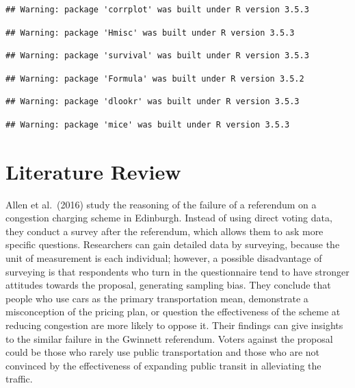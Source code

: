 \documentclass[
]{article}
\begin{document}
\begin{verbatim}
## Warning: package 'corrplot' was built under R version 3.5.3
\end{verbatim}

\begin{verbatim}
## Warning: package 'Hmisc' was built under R version 3.5.3
\end{verbatim}

\begin{verbatim}
## Warning: package 'survival' was built under R version 3.5.3
\end{verbatim}

\begin{verbatim}
## Warning: package 'Formula' was built under R version 3.5.2
\end{verbatim}

\begin{verbatim}
## Warning: package 'dlookr' was built under R version 3.5.3
\end{verbatim}

\begin{verbatim}
## Warning: package 'mice' was built under R version 3.5.3
\end{verbatim}

\hypertarget{literature-review}{%
\section{Literature Review}\label{literature-review}}

Allen et al.~(2016) study the reasoning of the failure of a referendum
on a congestion charging scheme in Edinburgh. Instead of using direct
voting data, they conduct a survey after the referendum, which allows
them to ask more specific questions. Researchers can gain detailed data
by surveying, because the unit of measurement is each individual;
however, a possible disadvantage of surveying is that respondents who
turn in the questionnaire tend to have stronger attitudes towards the
proposal, generating sampling bias. They conclude that people who use
cars as the primary transportation mean, demonstrate a misconception of
the pricing plan, or question the effectiveness of the scheme at
reducing congestion are more likely to oppose it. Their findings can
give insights to the similar failure in the Gwinnett referendum. Voters
against the proposal could be those who rarely use public transportation
and those who are not convinced by the effectiveness of expanding public
transit in alleviating the traffic.
\end{document}
